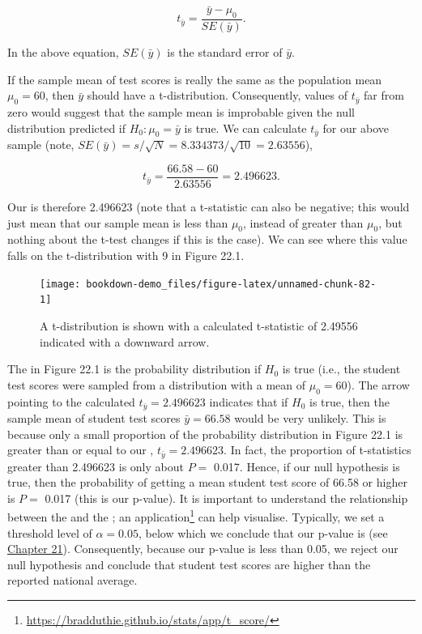 \documentclass[
  openany]{krantz}
\begin{document}
\[t_{\bar{y}} = \frac{\bar{y} - \mu_{0}}{SE(\bar{y})}.\]

In the above equation, \(SE(\bar{y})\) is the standard error of \(\bar{y}\).

If the sample mean of test scores is really the same as the population mean \(\mu_{0} = 60\), then \(\bar{y}\) should have a t-distribution.
Consequently, values of \(t_{\bar{y}}\) far from zero would suggest that the sample mean is improbable given the null distribution predicted if \(H_{0}: \mu_{0} = \bar{y}\) is true.
We can calculate \(t_{\bar{y}}\) for our above sample (note, \(SE(\bar{y}) = s/\sqrt{N} = 8.334373 / \sqrt{10} = 2.63556\)),

\[t_{\bar{y}} = \frac{66.58 - 60}{2.63556} = 2.496623.\]

Our  is therefore 2.496623 (note that a t-statistic can also be negative; this would just mean that our sample mean is less than \(\mu_{0}\), instead of greater than \(\mu_{0}\), but nothing about the t-test changes if this is the case).
We can see where this value falls on the t-distribution with 9  in Figure 22.1.

\begin{figure}
\texttt{[image: bookdown-demo\_files/figure-latex/unnamed-chunk-82-1]} \caption{A t-distribution is shown with a calculated t-statistic of 2.49556 indicated with a downward arrow.}\label{fig:unnamed-chunk-82}
\end{figure}

The  in Figure 22.1 is the probability distribution if \(H_{0}\) is true (i.e., the student test scores were sampled from a distribution with a mean of \(\mu_{0} = 60\)).
The arrow pointing to the calculated \(t_{\bar{y}} = 2.496623\) indicates that if \(H_{0}\) is true, then the sample mean of student test scores \(\bar{y} = 66.58\) would be very unlikely.
This is because only a small proportion of the probability distribution in Figure 22.1 is greater than or equal to our , \(t_{\bar{y}} = 2.496623\).
In fact, the proportion of t-statistics greater than 2.496623 is only about \(P =\) 0.017.
Hence, if our null hypothesis is true, then the probability of getting a mean student test score of 66.58 or higher is \(P =\) 0.017 (this is our p-value).
It is important to understand the relationship between the  and the ; an  application\footnote{\url{https://bradduthie.github.io/stats/app/t_score/}} can help visualise.
Typically, we set a threshold level of \(\alpha = 0.05\), below which we conclude that our p-value is  (see \protect\hyperlink{Chapter_21}{Chapter 21}).
Consequently, because our p-value is less than 0.05, we reject our null hypothesis and conclude that student test scores are higher than the reported national average.
\end{document}
